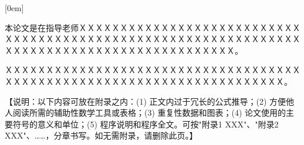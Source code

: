 \documentclass[a4paper]{ltxdoc}
\numberwithin{equation}{section} %
\begin{document}






\begingroup
    \baselineskip=22pt %
    {
        \setlength{\cftfignumwidth}{3.5em}
        \setlength{\cfttabnumwidth}{3.5em}
        \clearpage

        [0em]{\heiti }
        {\thecontentslabel\ }{}
        {\hspace{.5em}\titlerule*[4pt]{$\cdot$}\contentspage}

        \tableofcontents

        \clearpage
        \listoffigures

        \clearpage
        \listoftables

    }
\endgroup

\fancyhead{}
\pagestyle{fancy}




{
\clearpage %
\nocite{*} %
\wuhao
\setlength{\baselineskip}{20pt}
}



\begin{acknowledge}
本论文是在指导老师ＸＸＸＸＸＸＸＸＸＸＸＸＸＸＸＸＸＸＸＸＸＸＸＸＸＸＸＸＸＸＸＸＸＸＸＸＸＸＸＸＸＸＸＸＸＸＸＸＸＸＸＸＸＸＸＸＸＸＸＸＸＸＸＸＸＸＸＸＸＸＸＸＸＸＸＸＸＸＸＸＸＸＸＸＸＸＸＸＸＸＸ。

ＸＸＸＸＸＸＸＸＸＸＸＸＸＸＸＸＸＸＸＸＸＸＸＸＸＸＸＸＸＸＸＸＸＸＸＸＸＸＸＸＸＸＸＸＸＸＸＸＸＸＸＸＸＸＸＸＸＸＸＸＸＸＸＸＸＸＸＸＸＸ。
\end{acknowledge}




\begin{appendix}
【说明：以下内容可放在附录之内：(1) 正文内过于冗长的公式推导；(2) 方便他人阅读所需的辅助性数学工具或表格；(3) 重复性数据和图表；(4) 论文使用的主要符号的意义和单位；(5) 程序说明和程序全文。可按"附录1  XXX"、"附录2  XXX"、……，分章书写。如无需附录，请删除此页。】
\end{appendix}
\end{document}

